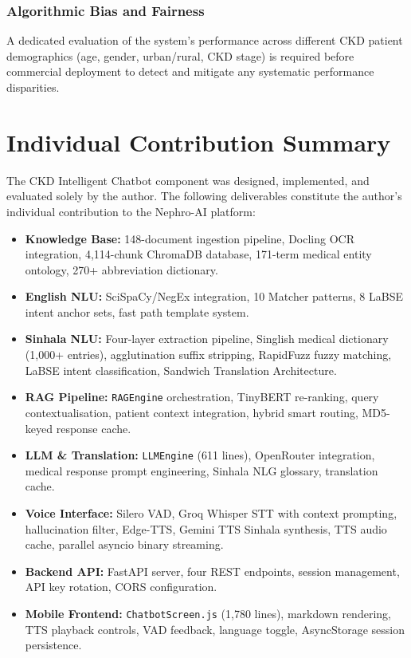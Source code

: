 \documentclass[12pt,a4paper]{report}
\begin{document}
\subsection{Algorithmic Bias and Fairness}

A dedicated evaluation of the system's performance across different CKD patient demographics (age, gender, urban/rural, CKD stage) is required before commercial deployment to detect and mitigate any systematic performance disparities.

\chapter{Individual Contribution Summary}
\label{sec:contrib}

The CKD Intelligent Chatbot component was designed, implemented, and evaluated solely by the author. The following deliverables constitute the author's individual contribution to the Nephro-AI platform:

\begin{itemize}
  \item \textbf{Knowledge Base:} 148-document ingestion pipeline, Docling OCR integration, 4,114-chunk ChromaDB database, 171-term medical entity ontology, 270+ abbreviation dictionary.

  \item \textbf{English NLU:} SciSpaCy/NegEx integration, 10 Matcher patterns, 8 LaBSE intent anchor sets, fast path template system.

  \item \textbf{Sinhala NLU:} Four-layer extraction pipeline, Singlish medical dictionary (1,000+ entries), agglutination suffix stripping, RapidFuzz fuzzy matching, LaBSE intent classification, Sandwich Translation Architecture.

  \item \textbf{RAG Pipeline:} \texttt{RAGEngine} orchestration, TinyBERT re-ranking, query contextualisation, patient context integration, hybrid smart routing, MD5-keyed response cache.

  \item \textbf{LLM \& Translation:} \texttt{LLMEngine} (611 lines), OpenRouter integration, medical response prompt engineering, Sinhala NLG glossary, translation cache.

  \item \textbf{Voice Interface:} Silero VAD, Groq Whisper STT with context prompting, hallucination filter, Edge-TTS, Gemini TTS Sinhala synthesis, TTS audio cache, parallel asyncio binary streaming.

  \item \textbf{Backend API:} FastAPI server, four REST endpoints, session management, API key rotation, CORS configuration.

  \item \textbf{Mobile Frontend:} \texttt{ChatbotScreen.js} (1,780 lines), markdown rendering, TTS playback controls, VAD feedback, language toggle, AsyncStorage session persistence.
\end{itemize}
\end{document}
